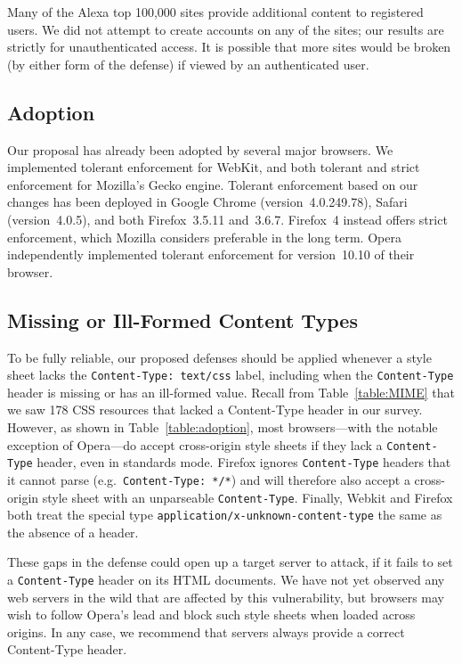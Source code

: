 \documentclass{acm_proc_article-sp}
\begin{document}
Many of the Alexa top 100,000 sites provide additional content to
registered users.  We did not attempt to create accounts on any of the
sites; our results are strictly for unauthenticated access.  It is
possible that more sites would be broken (by either form of the
defense) if viewed by an authenticated user.

\subsection{Adoption}
Our proposal has already been adopted by several major browsers.  We
implemented tolerant enforcement for WebKit, and both tolerant and
strict enforcement for Mozilla's Gecko engine.  Tolerant enforcement
based on our changes has been deployed in Google Chrome
(version~4.0.249.78), Safari (version~4.0.5), and both Firefox~3.5.11
and~3.6.7.  Firefox~4 instead offers strict enforcement, which Mozilla
considers preferable in the long term.  Opera independently
implemented tolerant enforcement for version~10.10 of their browser.

\subsection{Missing or Ill-Formed Content Types}\label{sec:missing}
To be fully reliable, our proposed defenses should be applied whenever
a style sheet lacks the \verb|Content-Type: text/css| label, including
when the \texttt{Content-Type} header is missing or has an ill-formed
value.  Recall from Table~\ref{table:MIME} that we saw 178 CSS
resources that lacked a Content-Type header in our survey.  However,
as shown in Table~\ref{table:adoption}, most browsers---with the
notable exception of Opera---do accept cross-origin style sheets if
they lack a \texttt{Content-Type} header, even in standards mode.
Firefox ignores \texttt{Content-Type} headers that it cannot parse
(e.g.~\verb|Content-Type: */*|) and will therefore also accept a
cross-origin style sheet with an unparseable \texttt{Content-Type}.
Finally, Webkit and Firefox both treat the special type
\texttt{application/x-unknown-content-type} the same as the absence of
a header.

These gaps in the defense could open up a target server to attack, if
it fails to set a \texttt{Content-Type} header on its HTML
documents. We have not yet observed any web servers in the wild that
are affected by this vulnerability, but browsers may wish to follow
Opera's lead and block such style sheets when loaded across
origins. In any case, we recommend that servers always provide a
correct Content-Type header.
\end{document}
